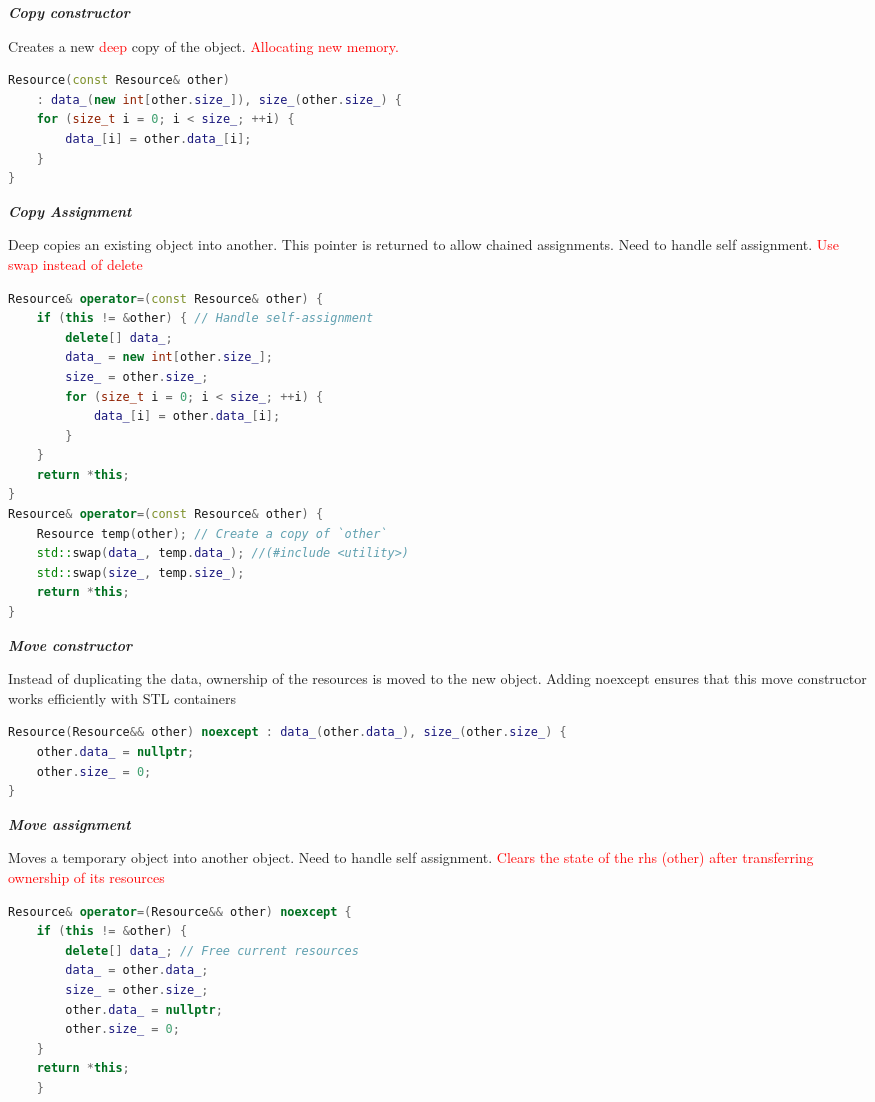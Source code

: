 \documentclass[fontsize=8pt, a4paper, landscape, fleqn]{scrartcl}
\renewcommand{\subsubsection}[1]{%
    \noindent\textbf{\textit{\color{subsectioncolor}#1}}%
    \vspace{1mm}%
}
\begin{document}
\begin{multicols*}{3}[\raggedcolumns]
    \subsubsection{Copy constructor} 
    Creates a new  \textcolor{red}{deep} copy of the object. \textcolor{red}{Allocating new memory.}
    \begin{lstlisting}[language=C++, breaklines]
Resource(const Resource& other)
    : data_(new int[other.size_]), size_(other.size_) {
    for (size_t i = 0; i < size_; ++i) {
        data_[i] = other.data_[i];
    }
}\end{lstlisting}

    \subsubsection{Copy Assignment} 
    Deep copies an existing object into another. This pointer is returned to allow chained assignments. 
    Need to handle self assignment.
    \textcolor{red}{Use swap instead of delete }
    \begin{lstlisting}[language=C++, breaklines]
Resource& operator=(const Resource& other) {
    if (this != &other) { // Handle self-assignment
        delete[] data_;
        data_ = new int[other.size_];
        size_ = other.size_;
        for (size_t i = 0; i < size_; ++i) {
            data_[i] = other.data_[i];
        }
    }
    return *this;
}
Resource& operator=(const Resource& other) {
    Resource temp(other); // Create a copy of `other`
    std::swap(data_, temp.data_); //(#include <utility>)
    std::swap(size_, temp.size_);
    return *this;
}\end{lstlisting}
    \subsubsection{Move constructor}
    Instead of duplicating the data, ownership of the resources is moved to the new object.
Adding noexcept ensures that this move constructor works efficiently with STL containers
    \begin{lstlisting}[language=C++, breaklines]
Resource(Resource&& other) noexcept : data_(other.data_), size_(other.size_) {
    other.data_ = nullptr;
    other.size_ = 0;
}\end{lstlisting}
    
    \subsubsection{Move assignment}
    Moves a temporary object into another object. Need to handle self assignment. \textcolor{red}{Clears the state of the rhs (other) after transferring ownership of its resources}
    \begin{lstlisting}[language=C++, breaklines]
Resource& operator=(Resource&& other) noexcept {
    if (this != &other) {
        delete[] data_; // Free current resources
        data_ = other.data_;
        size_ = other.size_;
        other.data_ = nullptr;
        other.size_ = 0;
    }
    return *this;
    }
    \end{lstlisting}

\end{multicols*}
\end{document}
